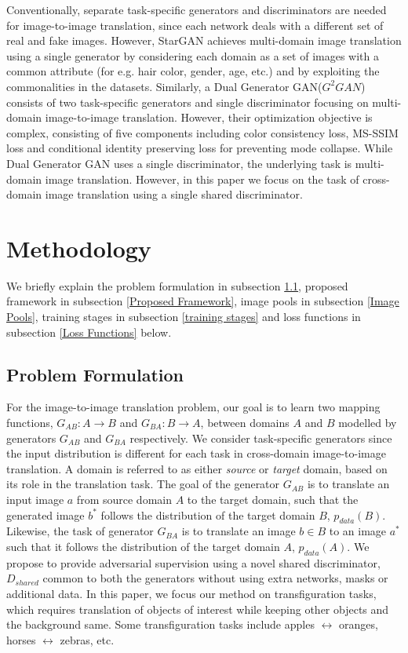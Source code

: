 \documentclass[a4paper,twoside]{article}
\begin{document}
Conventionally, separate task-specific generators and discriminators are needed for image-to-image translation, since each network deals with a different set of real and fake images. However, StarGAN \cite{Choi2018CVPRStarGAN} achieves multi-domain image translation using a single generator by considering each domain as a set of images with a common attribute (for e.g. hair color, gender, age, etc.) and by exploiting the commonalities in the datasets. Similarly, a Dual Generator GAN($G^2GAN$) \cite{Tang2019G2GAN} consists of two task-specific generators and single discriminator focusing on multi-domain image-to-image translation. However, their optimization objective is complex, consisting of five components including color consistency loss, MS-SSIM loss and conditional identity preserving loss for preventing mode collapse. While Dual Generator GAN uses a single discriminator, the underlying task is multi-domain image translation. However, in this paper we focus on the task of cross-domain image translation using a single shared discriminator.
\section{Methodology}
\noindent
We briefly explain the problem formulation in subsection \ref{Problem Formulation}, proposed framework in subsection \ref{Proposed Framework}, image pools in subsection \ref{Image Pools}, training stages in subsection \ref{training stages} and loss functions in subsection \ref{Loss Functions} below.
\subsection{Problem Formulation}
\label{Problem Formulation}
\noindent
For the image-to-image translation problem, our goal is to learn two mapping functions, $G_{AB}:A\rightarrow B$ and  $G_{BA}:B\rightarrow A$, between domains $A$ and $B$ modelled by generators $G_{AB}$ and $G_{BA}$ respectively. We consider task-specific generators since the input distribution is different for each task in cross-domain image-to-image translation. A domain is referred to as either \textit{source} or \textit{target} domain, based on its role in the translation task. The goal of the generator $G_{AB}$ is to translate an input image $a$ from source domain $A$ to the target domain, such that the generated image $b^*$ follows the distribution of the target domain $B$, $p_{data}(B)$. Likewise, the task of generator $G_{BA}$ is to translate an image $b \in B$ to an image $a^*$ such that it follows the distribution of the target domain $A$, $p_{data}(A)$. We propose to provide adversarial supervision using a novel shared discriminator, $D_{shared}$ common to both the generators without using extra networks, masks or additional data. In this paper, we focus our method on transfiguration tasks, which requires translation of objects of interest while keeping other objects and the background same. Some transfiguration tasks include apples $\leftrightarrow$ oranges, horses $\leftrightarrow$ zebras, etc.
\end{document}
